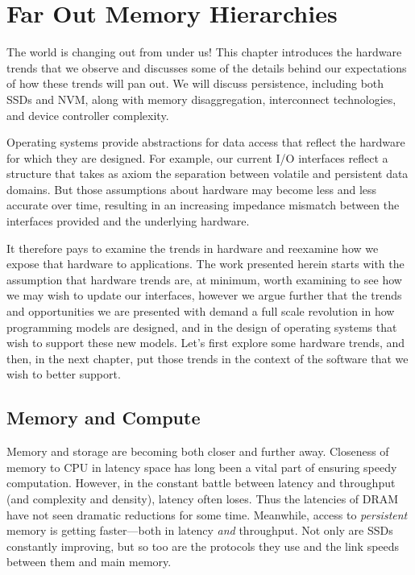 \chapter{Far Out Memory Hierarchies}\label{ch:farout}


\begin{chabstract}
    The world is changing out from under us!
    This chapter introduces the hardware trends that we observe and discusses some of the details behind our expectations of how these trends will pan out. We will discuss persistence,
    including both SSDs and NVM, along with memory disaggregation, interconnect technologies, and device controller complexity.
\end{chabstract}

Operating systems provide abstractions for data access that reflect the hardware for which they are designed. For example, our current I/O interfaces reflect a structure that takes as axiom
the separation between volatile and persistent data domains. But those assumptions about hardware may become less and less accurate over time, resulting in an increasing impedance mismatch
between the interfaces provided and the underlying hardware.

It therefore pays to examine the trends in hardware and reexamine how we expose that hardware to applications. The work presented
herein starts with the assumption that hardware trends are, at minimum, worth examining to see how we may wish to update our interfaces, however we argue further that the trends and
opportunities we are presented with demand a full scale revolution in how programming models are designed, and in the design of operating systems that wish to support these new models. Let's
first explore some hardware trends, and then, in the next chapter, put those trends in the context of the software that we wish to better support.


\section{Memory and Compute}

Memory and storage are becoming both closer and further away. Closeness of memory to CPU in latency space has long been a vital part of ensuring speedy
computation. However, in the constant battle between latency and throughput (and complexity and density), latency often loses. Thus the latencies of DRAM have not seen dramatic reductions
for some time. Meanwhile, access to \emph{persistent} memory is getting faster---both in latency \emph{and} throughput. Not only are SSDs constantly improving, but so too are the protocols
they use and the link speeds between them and main memory.

